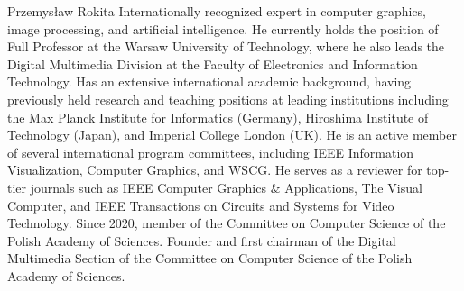 \documentclass[journal,twoside,web]{ieeecolor}
\begin{document}
\begin{IEEEbiographynophoto}{Przemysław Rokita}
    Internationally recognized expert in computer graphics, image processing, and artificial intelligence. He currently holds the position of Full Professor at the Warsaw University of Technology, where he also leads the Digital Multimedia Division at the Faculty of Electronics and Information Technology. Has an extensive international academic background, having previously held research and teaching positions at leading institutions including the Max Planck Institute for Informatics (Germany), Hiroshima Institute of Technology (Japan), and Imperial College London (UK). He is an active member of several international program committees, including IEEE Information Visualization, Computer Graphics, and WSCG. He serves as a reviewer for top-tier journals such as IEEE Computer Graphics \& Applications, The Visual Computer, and IEEE Transactions on Circuits and Systems for Video Technology. Since 2020, member of the Committee on Computer Science of the Polish Academy of Sciences. Founder and first chairman of the Digital Multimedia Section of the Committee on Computer Science of the Polish Academy of Sciences.
\end{IEEEbiographynophoto}
\vfill
\end{document}
